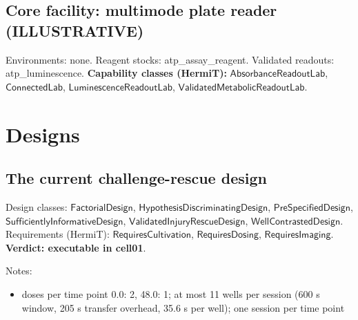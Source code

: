 \documentclass[10pt,a4paper]{article}
\begin{document}
\subsection*{Core facility: multimode plate reader (ILLUSTRATIVE)}
\par{}
\par Environments: none. Reagent stocks: atp\_assay\_reagent. Validated readouts: atp\_luminescence. \textbf{Capability classes (HermiT):} $\mathsf{AbsorbanceReadoutLab}$, $\mathsf{ConnectedLab}$, $\mathsf{LuminescenceReadoutLab}$, $\mathsf{ValidatedMetabolicReadoutLab}$.
\section*{Designs}
\subsection*{The current challenge-rescue design}
Design classes: $\mathsf{FactorialDesign}$, $\mathsf{HypothesisDiscriminatingDesign}$, $\mathsf{PreSpecifiedDesign}$, $\mathsf{SufficientlyInformativeDesign}$, $\mathsf{ValidatedInjuryRescueDesign}$, $\mathsf{WellContrastedDesign}$. Requirements (HermiT): $\mathsf{RequiresCultivation}$, $\mathsf{RequiresDosing}$, $\mathsf{RequiresImaging}$. \textbf{Verdict: \textcolor{green!45!black}{executable in cell01}}.
\par{}
Notes:\begin{itemize}[nosep]\item doses per time point {0.0: 2, 48.0: 1}; at most 11 wells per session (600 s window, 205 s transfer overhead, 35.6 s per well); one session per time point\end{itemize}
\end{document}
